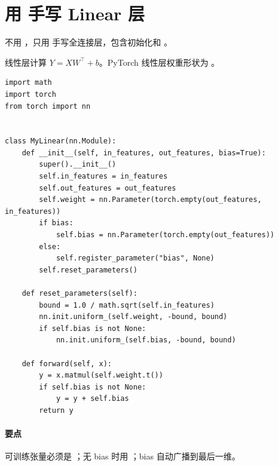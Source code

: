 \section{用  手写 Linear 层}
\begin{interview}
不用 ，只用  手写全连接层，包含初始化和 。
\end{interview}
\begin{answer}
线性层计算 $Y=XW^\top+b$。PyTorch 线性层权重形状为 。
\begin{lstlisting}
import math
import torch
from torch import nn


class MyLinear(nn.Module):
    def __init__(self, in_features, out_features, bias=True):
        super().__init__()
        self.in_features = in_features
        self.out_features = out_features
        self.weight = nn.Parameter(torch.empty(out_features, in_features))
        if bias:
            self.bias = nn.Parameter(torch.empty(out_features))
        else:
            self.register_parameter("bias", None)
        self.reset_parameters()

    def reset_parameters(self):
        bound = 1.0 / math.sqrt(self.in_features)
        nn.init.uniform_(self.weight, -bound, bound)
        if self.bias is not None:
            nn.init.uniform_(self.bias, -bound, bound)

    def forward(self, x):
        y = x.matmul(self.weight.t())
        if self.bias is not None:
            y = y + self.bias
        return y
\end{lstlisting}
\paragraph{要点} 可训练张量必须是 ；无 bias 时用 ；bias 自动广播到最后一维。
\end{answer}

